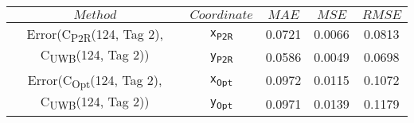 \begin{table}[h]
\centering
\begin{tabular}{|c|c|c|c|c|}
\hline
$Method$ & $Coordinate$ & $MAE$ & $MSE$ & $RMSE$ \\
\hline
\multirow{2}{*}{{\footnotesize Error(C\textsubscript{P2R}(124, Tag 2), C\textsubscript{UWB}(124, Tag 2))}} & \texttt{x\textsubscript{P2R}} & 0.0721 & 0.0066 & 0.0813 \\
& \texttt{y\textsubscript{P2R}} & 0.0586 & 0.0049 & 0.0698 \\
\hline
\multirow{2}{*}{{\footnotesize Error(C\textsubscript{Opt}(124, Tag 2), C\textsubscript{UWB}(124, Tag 2))}} & \texttt{x\textsubscript{Opt}} & 0.0972 & 0.0115 & 0.1072 \\
& \texttt{y\textsubscript{Opt}} & 0.0971 & 0.0139 & 0.1179 \\
\hline
\end{tabular}
\end{table}
